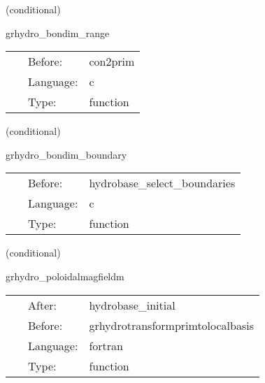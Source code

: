 \vspace{5mm}

   (conditional) 

\hspace{5mm} grhydro\_bondim\_range 

\hspace{5mm}{\it force analytic solution outside anulus } 


\hspace{5mm}

 \begin{tabular*}{160mm}{cll} 
~ & Before:  & con2prim \\ 
~ & Language:  & c \\ 
~ & Type:  & function \\ 
\end{tabular*} 


\vspace{5mm}

   (conditional) 

\hspace{5mm} grhydro\_bondim\_boundary 

\hspace{5mm}{\it force analytic solution in boundaries } 


\hspace{5mm}

 \begin{tabular*}{160mm}{cll} 
~ & Before:  & hydrobase\_select\_boundaries \\ 
~ & Language:  & c \\ 
~ & Type:  & function \\ 
\end{tabular*} 


\vspace{5mm}

   (conditional) 

\hspace{5mm} grhydro\_poloidalmagfieldm 

\hspace{5mm}{\it set up a poloidal magnetic field. it expects the other fluid variables already to be set, as for example in the tov solution } 


\hspace{5mm}

 \begin{tabular*}{160mm}{cll} 
~ & After:  & hydrobase\_initial \\ 
~ & Before:  & grhydrotransformprimtolocalbasis \\ 
~ & Language:  & fortran \\ 
~ & Type:  & function \\ 
\end{tabular*} 


